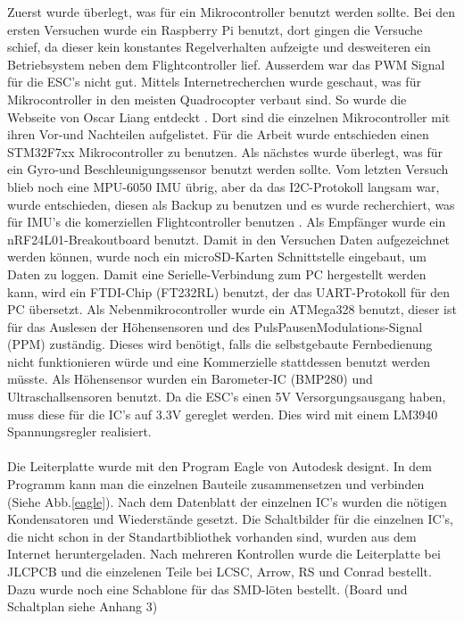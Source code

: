 \documentclass[12pt,a4paper, ngerman]{article}
\begin{document}
\fi
Zuerst wurde überlegt, was für ein Mikrocontroller benutzt werden sollte. Bei den ersten Versuchen wurde ein Raspberry Pi benutzt, dort gingen die Versuche schief, da dieser kein konstantes Regelverhalten aufzeigte und desweiteren ein Betriebsystem neben dem Flightcontroller lief. Ausserdem war das PWM Signal für die ESC's nicht gut. Mittels Internetrecherchen wurde geschaut, was für Mikrocontroller in den meisten Quadrocopter verbaut sind. So wurde die Webseite von Oscar Liang entdeckt \cite{website:OS_MCU_COLL}. Dort sind die einzelnen Mikrocontroller mit ihren Vor-und Nachteilen aufgelistet. Für die Arbeit wurde entschieden einen STM32F7xx Mikrocontroller zu benutzen. Als nächstes wurde überlegt, was für ein Gyro-und Beschleunigungssensor benutzt werden sollte. Vom letzten Versuch blieb noch eine MPU-6050 IMU übrig, aber da das I2C-Protokoll langsam war, wurde entschieden, diesen als Backup zu benutzen und es wurde recherchiert, was für IMU's die komerziellen Flightcontroller benutzen \cite{website:IMU_COLL}. Als Empfänger wurde ein nRF24L01-Breakoutboard benutzt. Damit in den Versuchen Daten aufgezeichnet werden können, wurde noch ein microSD-Karten Schnittstelle eingebaut, um Daten zu loggen. Damit eine Serielle-Verbindung zum PC hergestellt werden kann, wird ein FTDI-Chip (FT232RL) benutzt, der das UART-Protokoll für den PC übersetzt. Als Nebenmikrocontroller wurde ein ATMega328 benutzt, dieser ist für das Auslesen der Höhensensoren und des PulsPausenModulations-Signal (PPM) zuständig. Dieses wird benötigt, falls die selbstgebaute Fernbedienung nicht funktionieren würde und eine Kommerzielle stattdessen benutzt werden müsste. Als Höhensensor wurden ein Barometer-IC (BMP280) und Ultraschallsensoren benutzt. Da die ESC's einen 5V Versorgungsausgang haben, muss diese für die IC's auf 3.3V gereglet werden. Dies wird mit einem LM3940 Spannungsregler realisiert. \\ \\ Die Leiterplatte wurde mit den Program Eagle von Autodesk designt. In dem Programm kann man die einzelnen Bauteile zusammensetzen und verbinden (Siehe Abb.\ref{eagle}). Nach dem Datenblatt der einzelnen IC's wurden die nötigen Kondensatoren und Wiederstände gesetzt. Die Schaltbilder für die einzelnen IC's, die nicht schon in der Standartbibliothek vorhanden sind, wurden aus dem Internet heruntergeladen. Nach mehreren Kontrollen wurde die Leiterplatte bei JLCPCB und die einzelenen Teile bei LCSC, Arrow, RS und Conrad bestellt. Dazu wurde noch eine Schablone für das SMD-löten bestellt. (Board und Schaltplan siehe Anhang 3)
\end{document}

